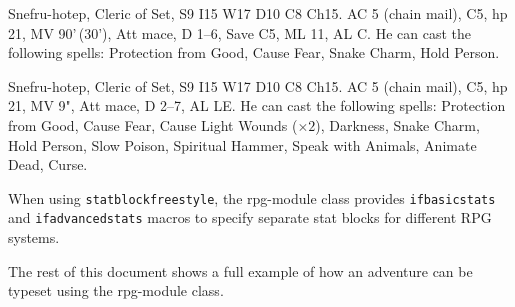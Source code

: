 \documentclass[letterpaper,serif]{rpg-module}
\begin{document}

\begin{statblockfreestyle}
\begin{ifbasicstats}
Snefru-hotep, Cleric of Set, S9 I15 W17 D10 C8 Ch15. AC 5 (chain mail), C5, hp 21, MV 90'\,(30'), Att mace, D 1--6, Save C5, ML 11, AL C.
He can cast the following spells: Protection from Good, Cause Fear, Snake Charm, Hold Person.
\end{ifbasicstats}
\begin{ifadvancedstats}
Snefru-hotep, Cleric of Set, S9 I15 W17 D10 C8 Ch15. AC 5 (chain mail), C5, hp 21, MV 9", Att mace, D 2--7, AL LE.
He can cast the following spells: Protection from Good, Cause Fear, Cause Light Wounds ($\times 2$), Darkness,
Snake Charm, Hold Person, Slow Poison, Spiritual Hammer, Speak with Animals, Animate Dead, Curse.
\end{ifadvancedstats}
\end{statblockfreestyle}

\noindent When using \verb|statblockfreestyle|, the rpg-module class provides \verb|ifbasicstats| and \verb|ifadvancedstats| macros to specify separate
stat blocks for different RPG systems.

The rest of this document shows a full example of how an adventure can be typeset using the rpg-module class.

\newpage


\end{document}
